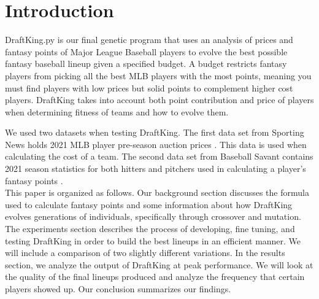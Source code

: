 
\section{Introduction}
\label{sec:intro}

DraftKing.py is our final genetic program that uses an analysis of prices and fantasy points of Major League Baseball players to evolve the best possible fantasy baseball lineup given a specified budget. A budget restricts fantasy players from picking all the best MLB players with the most points, meaning you must find players with low prices but solid points to complement higher cost players. DraftKing takes into account both point contribution and price of players when determining fitness of teams and how to evolve them. 

We used two datasets when testing DraftKing. The first data set from Sporting News holds 2021 MLB player pre-season auction prices \cite{optionPrice}. This data is used when calculating the cost of a team. The second data set from Baseball Savant contains 2021 season statistics for both hitters and pitchers used in calculating a player's fantasy points \cite{stats}. \\

This paper is organized as follows. Our background section discusses the formula used to calculate fantasy points and some information about how DraftKing evolves generations of individuals, specifically through crossover and mutation. The experiments section describes the process of developing, fine tuning, and testing DraftKing in order to build the best lineups in an efficient manner. We will include a comparison of two slightly different variations. In the results section, we analyze the output of DraftKing at peak performance. We will look at the quality of the final lineups produced and analyze the frequency that certain players showed up. Our conclusion summarizes our findings.





